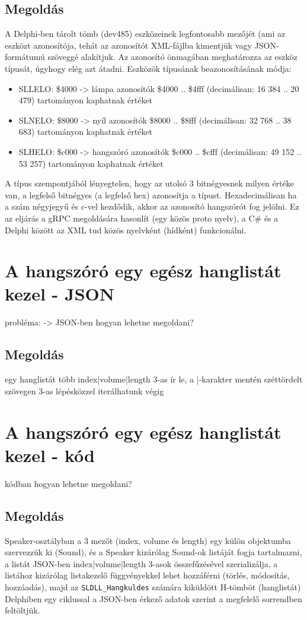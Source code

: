 \documentclass[tocnopagenum]{thesis-ekf}
\theoremstyle{definition}
\theoremstyle{remark}
\begin{document}
	\subsection{Megoldás}
	A Delphi-ben tárolt tömb (dev485) eszközeinek legfontosabb mezőjét (ami az eszközt azonosítója, tehát az azonosítót XML-fájlba kimentjük vagy JSON-formátumú szöveggé alakítjuk. Az azonosító önmagában meghatározza az eszköz típusát, úgyhogy elég azt átadni.
	Eszközök típusának beazonosításának módja:
	\begin{itemize}
		\item SLLELO: \$4000 -> lámpa azonosítók \$4000 .. \$4fff (decimálisan: 16 384 .. 20 479) tartományon kaphatnak értéket
		\item SLNELO: \$8000 -> nyíl azonosítók \$8000 .. \$8fff (decimálisan: 32 768 .. 38 683) tartományon kaphatnak értéket
		\item SLHELO: \$c000 -> hangszóró azonosítók \$c000 .. \$cfff (decimálisan: 49 152 .. 53 257) tartományon kaphatnak értéket
	\end{itemize}
	A típus szempontjából lényegtelen, hogy az utolsó 3 bitnégyesnek milyen értéke van, a legfelső bitnégyes (a legfelső hex) azonosítja a típust.
	Hexadecimálisan ha a szám négyjegyű és c-vel kezdődik, akkor az azonosító hangszórót fog jelölni.
	Ez az eljárás a gRPC megoldására hasonlít (egy közös proto nyelv), a C\# és a Delphi között az XML tud közös nyelvként (hídként) funkcionálni.
	\section{A hangszóró egy egész hanglistát kezel - JSON}
	probléma:  -> JSON-ben hogyan lehetne megoldani?
	\subsection{Megoldás}
	egy hanglistát több index|volume|length 3-as ír le, a |-karakter mentén széttördelt szövegen 3-as lépésközzel iterálhatunk végig
	\section{A hangszóró egy egész hanglistát kezel - kód}
	kódban hogyan lehetne megoldani?
	\subsection{Megoldás}
	Speaker-osztályban a 3 mezőt (index, volume és length) egy külön objektumba szervezzük ki (Sound), és a Speaker kizárólag Sound-ok listáját fogja tartalmazni, a listát JSON-ben index|volume|length 3-asok összefűzésével szerializálja, a listához kizárólag listakezelő függvényekkel lehet hozzáférni (törlés, módosítás, hozzáadás), majd az \verb*|SLDLL_Hangkuldes| számára kiküldött H-tömböt (hanglistát) Delphiben egy ciklussal a JSON-ben érkező adatok szerint a megfelelő sorrendben feltöltjük.
\end{document}
